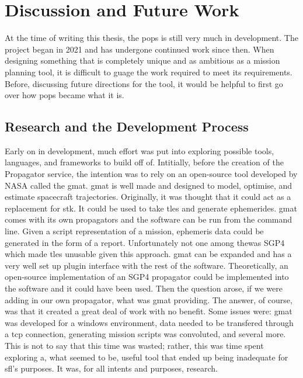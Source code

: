 \glsresetall{} 

\chapter{Discussion and Future Work}\label{chap:discussion}

\lettrine[lines=2, findent=0pt, nindent=5pt]{A}{}t the time of writing this
thesis, the \gls{pops} is still very much in development. The project began in
2021 and has undergone continued work since then. When designing something that
is completely unique and as ambitious as a mission planning tool, it is
difficult to guage the work required to meet its requirements. Before,
discussing future directions for the tool, it would be helpful to first go over
how \gls{pops} became what it is. 

\section{Research and the Development Process}

Early on in development, much effort was put into exploring possible tools,
languages, and frameworks to build off of. Intitially, before the creation of
the Propagator service, the intention was to rely on an open-source tool
developed by NASA called the \gls{gmat}. \gls{gmat} is well made and designed
to model, optimise, and estimate spacecraft trajectories. Originally, it was
thought that it could act as a replacement for \gls{stk}. It could be used to
take \glspl{tle} and generate ephemerides. \gls{gmat} comes with its own
propagators and the software can be run from the command line. Given a script
representation of a mission, ephemeris data could be generated in the form of a
report. Unfortunately not one among thewas SGP4 which made \glspl{tle} unusable
given this approach. \gls{gmat} can be expanded and has a very well set up
plugin interface with the rest of the software. Theoretically, an open-source
implementation of an SGP4 propagator could be implemented into the software and
it could have been used. Then the question arose, if we were adding in our own
propagator, what was \gls{gmat} providing. The answer, of course, was that it
created a great deal of work with no benefit. Some issues were: \gls{gmat} was
developed for a windows environment, data needed to be transfered through a
\gls{tcp} connection, generating mission scripts was convoluted, and several
more. This is not to say that this time was wasted; rather, this was time spent
exploring a, what seemed to be, useful tool that ended up being inadequate for
\gls{sfl}'s purposes. It was, for all intents and purposes, research.


